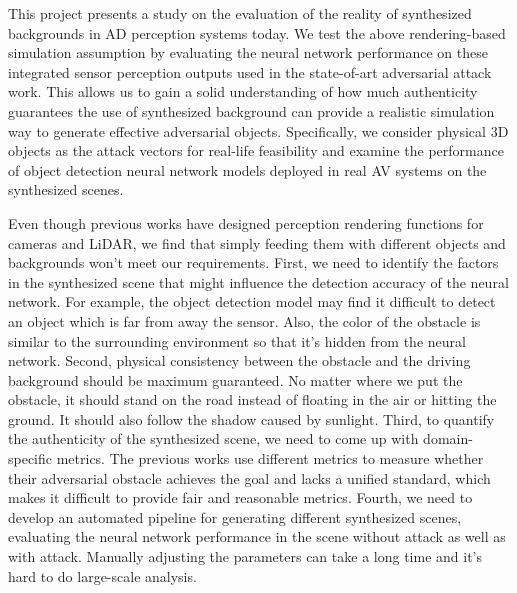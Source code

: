 This project presents a study on the evaluation of the reality of synthesized backgrounds in AD perception systems today.
We test the above rendering-based simulation assumption by evaluating the neural network performance on these integrated sensor perception outputs used in the state-of-art adversarial attack work.
This allows us to gain a solid understanding of how much authenticity guarantees the use of synthesized background can provide a realistic simulation way to generate effective adversarial objects.
Specifically, we consider physical 3D objects as the attack vectors for real-life feasibility and examine the performance of object detection neural network models deployed in real AV systems on the synthesized scenes.

Even though previous works have designed perception rendering functions for cameras and LiDAR, we find that simply feeding them with different objects and backgrounds won't meet our requirements.
First, we need to identify the factors in the synthesized scene that might influence the detection accuracy of the neural network.
For example, the object detection model may find it difficult to detect an object which is far from away the sensor.
Also, the color of the obstacle is similar to the surrounding environment so that it's hidden from the neural network.
Second, physical consistency between the obstacle and the driving background should be maximum guaranteed. 
No matter where we put the obstacle, it should stand on the road instead of floating in the air or hitting the ground.
It should also follow the shadow caused by sunlight.
Third, to quantify the authenticity of the synthesized scene, we need to come up with domain-specific metrics.
The previous works use different metrics to measure whether their adversarial obstacle achieves the goal and lacks a unified standard,
which makes it difficult to provide fair and reasonable metrics.
Fourth, we need to develop an automated pipeline for generating different synthesized scenes, evaluating the neural network performance in the scene without attack as well as with attack.
Manually adjusting the parameters can take a long time and it's hard to do large-scale analysis.


